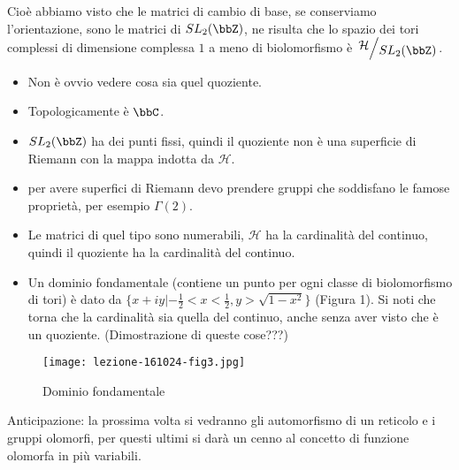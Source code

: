 Cioè abbiamo visto che le matrici di cambio di base, se conserviamo l'orientazione, sono le matrici di $SL_2(\bbZ)$, ne risulta che lo spazio dei tori complessi di dimensione complessa $1$ a meno di biolomorfismo è $\quotient{\mathcal{H}}{SL_2(\bbZ)}$.

\begin{osservazione}
\begin{itemize}
\item Non è ovvio vedere cosa sia quel quoziente.
\item Topologicamente è $\bbC$.
\item $SL_2(\bbZ)$ ha dei punti fissi, quindi il quoziente non è una superficie di Riemann con la mappa indotta da $\mathcal{H}$.
\item per avere superfici di Riemann devo prendere gruppi che soddisfano le famose proprietà, per esempio $\Gamma (2)$.
\item Le matrici di quel tipo sono numerabili, $\mathcal H$ ha la cardinalità del continuo, quindi il quoziente ha la cardinalità del continuo.
\item Un dominio fondamentale (contiene un punto per ogni classe di biolomorfismo di tori) è dato da $\{ x+iy | -\frac{1}{2}<x<\frac{1}{2}, y>\sqrt{1-x^2}\}$ (Figura 1). Si noti che torna che la cardinalità sia quella del continuo, anche senza aver visto che è un quoziente. (Dimostrazione di queste cose???)
\end{itemize}
\end{osservazione}

\begin{figure}[h]
\texttt{[image: lezione-161024-fig3.jpg]}
\caption{Dominio fondamentale}\label{fig:2}
\end{figure}

Anticipazione: la prossima volta si vedranno gli automorfismo di un reticolo e i gruppi olomorfi, per questi ultimi si darà un cenno al concetto di funzione olomorfa in più variabili.
